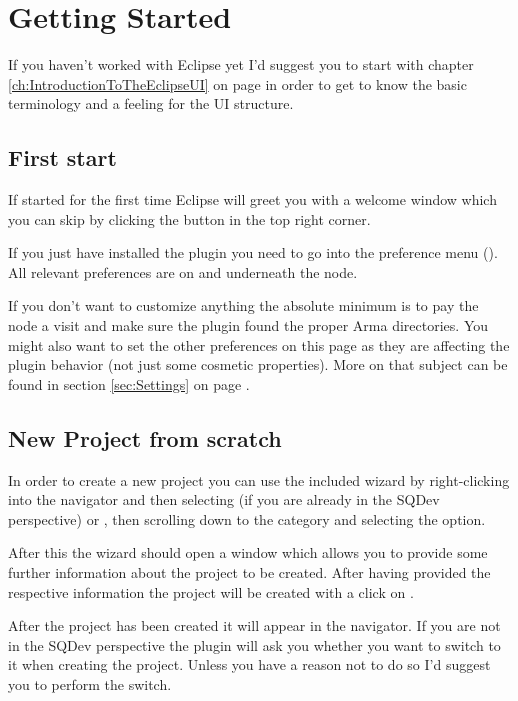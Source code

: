 \documentclass[twoside=false]{scrbook}
\newcommand{\SQDev}{SQDev\xspace}
\newcommand{\eclipse}{Eclipse\xspace}
\newcommand{\arma}{Arma\xspace}
\begin{document}
	
	
	\chapter{Getting Started}
	\label{ch:GettingStarted}
	
	If you haven't worked with \eclipse yet I'd suggest you to start with chapter \ref{ch:IntroductionToTheEclipseUI} on page \pageref{ch:IntroductionToTheEclipseUI} in order to get to know the basic terminology and a feeling for the UI structure.
	
	\section{First start}
	If started for the first time \eclipse will greet you with a welcome window which you can skip by clicking the  button in the top right corner.
	
	If you just have installed the plugin you need to go into the preference menu (). All relevant preferences are on and underneath the  node.
	
	If you don't want to customize anything the absolute minimum is to pay the  node a visit and make sure the plugin found the proper \arma directories. You might also want to set the other preferences on this page as they are affecting the plugin behavior (not just some cosmetic properties). More on that subject can be found in section \ref{sec:Settings} on page \pageref{sec:Settings}.
	
	\section{New Project from scratch}
	In order to create a new project you can use the included wizard by right-clicking into the navigator and then selecting  (if you are already in the \SQDev perspective) or , then scrolling down to the  category and selecting the  option.
	
	After this the wizard should open a window which allows you to provide some further information about the project to be created. After having provided the respective information the project will be created with a click on .
	
	After the project has been created it will appear in the navigator. If you are not in the \SQDev perspective the plugin will ask you whether you want to switch to it when creating the project. Unless you have a reason not to do so I'd suggest you to perform the switch.
	
\end{document}
